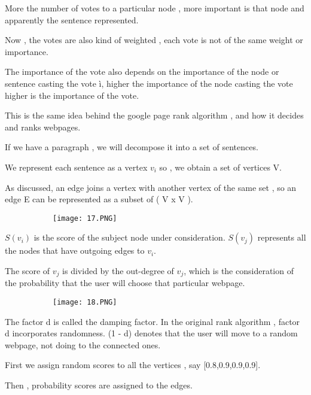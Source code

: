\documentclass{article}
\begin{document}
More the number of votes to a particular node , more important is that node and apparently the sentence represented.

Now , the votes are also kind of weighted , each vote is not of the same weight or importance.

The importance of the vote also depends on the importance of the node or sentence casting the vote ì, higher the importance of the node casting the vote higher is the importance of the vote.

This is the same idea behind the google page rank algorithm , and how it decides and ranks webpages.

If we have a paragraph , we will decompose it into a set of sentences.

We represent each sentence as a vertex $v_i$ so , we obtain a set of vertices V.

As discussed, an edge joins a vertex with another vertex of the same set , so an edge E can be represented as a subset of ( V x V ).

\begin{figure}[ht!]
  \centering
  \begin{subfigure}[b]{0.9\linewidth}
    \texttt{[image: 17.PNG]}
  \end{subfigure}
\end{figure}

$S(v_i)$ is the score of the subject node under consideration.
$S(v_j)$ represents all the nodes that have outgoing edges to $v_i$.

The score of $v_j$ is divided by the out-degree of $v_j$, which is the consideration of the probability that the user will choose that particular webpage.


\begin{figure}[ht!]
  \centering
  \begin{subfigure}[b]{0.9\linewidth}
    \texttt{[image: 18.PNG]}
  \end{subfigure}
\end{figure}

The factor d is called the damping factor. In the original rank algorithm , factor d incorporates randomness. (1 - d) denotes that the user will move to a random webpage, not doing to the connected ones.

First we assign random scores to all the vertices , say [0.8,0.9,0.9,0.9].

Then , probability scores are assigned to the edges.
\end{document}
